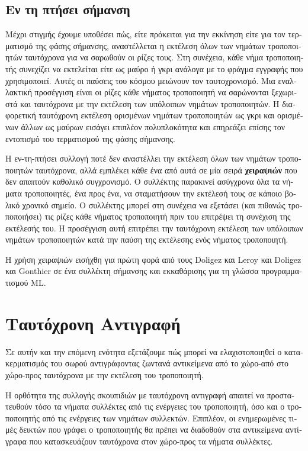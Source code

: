 \begin{greek}
\subsection{Εν τη πτήσει σήμανση}
Μέχρι στιγμής έχουμε υποθέσει πώς, είτε πρόκειται για την
εκκίνηση είτε για τον τερματισμό της φάσης σήμανσης, αναστέλλεται
η εκτέλεση όλων των νημάτων τροποποιητών ταυτόχρονα για να
σαρωθούν οι ρίζες τους. Στη συνέχεια, κάθε νήμα τροποποιητής
συνεχίζει να εκτελείται είτε ως μαύρο ή γκρι ανάλογα με το φράγμα
εγγραφής που χρησιμοποιεί. Αυτές οι παύσεις του κόσμου μειώνουν
τον ταυτοχρονισμό. Μια εναλλακτική προσέγγιση είναι οι ρίζες
κάθε νήματος τροποποιητή να σαρώνονται ξεχωριστά και ταυτόχρονα
με την εκτέλεση των υπόλοιπων νημάτων τροποποιητών. Η διαφορετική
ταυτόχρονη εκτέλεση ορισμένων νημάτων τροποποιητών ως γκρι και
ορισμένων άλλων ως μαύρων εισάγει επιπλέον πολυπλοκότητα και
επηρεάζει επίσης τον εντοπισμό του τερματισμού της φάσης σήμανσης.

Η εν-τη-πτήσει συλλογή ποτέ δεν αναστέλλει την εκτέλεση όλων
των νημάτων τροποποιητών ταυτόχρονα, αλλά εμπλέκει κάθε ένα από
αυτά σε μία σειρά \textbf{χειραψιών} που δεν απαιτούν καθολικό
συγχρονισμό. Ο συλλέκτης παρακινεί ασύγχρονα όλα τα νήματα
τροποποιητές, ένα προς ένα, να σταματήσουν την εκτέλεσή τους σε
κάποιο βολικό χρονικό σημείο. Ο συλλέκτης μπορεί στη συνέχεια
να εξετάσει (και πιθανώς τροποποιήσει) τις ρίζες κάθε νήματος
τροποποιητή πριν του επιτρέψει τη συνέχιση της εκτέλεσής του.
Η προσέγγιση αυτή επιτρέπει την ταυτόχρονη εκτέλεση των υπόλοιπων
νημάτων τροποποιητών κατά την παύση της εκτέλεσης ενός νήματος
τροποποιητή.

Η χρήση χειραψιών εισήχθη για πρώτη φορά από τους Doligez και
Leroy \cite{DBLP:conf/popl/DoligezL93} και Doligez και Gonthier
\cite{DBLP:conf/popl/DoligezG94} σε ένα συλλέκτη σήμανσης
και εκκαθάρισης για τη γλώσσα προγραμματισμού ML.

\section{Ταυτόχρονη Αντιγραφή}
Σε αυτήν και την επόμενη ενότητα εξετάζουμε πώς μπορεί να
ελαχιστοποιηθεί ο κατακερματισμός του σωρού αντιγράφοντας
ζωντανά αντικείμενα από το χώρο-από στο χώρο-προς ταυτόχρονα
με την εκτέλεση του τροποποιητή.

Η ορθότητα της συλλογής σκουπιδιών με ταυτόχρονη αντιγραφή
απαιτεί να προστατευθούν τόσο τα νήματα συλλέκτες από τις
ενέργειες του τροποποιητή, όσο και ο τροποποιητής από τις
ενέργειες των νημάτων συλλεκτών. Επιπλέον, οι ενημερωμένες
τιμές δεικτών που γράφει ο τροποποιητής θα πρέπει να
διαδοθούν στα αντικείμενα αντίγραφα που κατασκευάζουν
ταυτόχρονα στον χώρο-προς τα νήματα συλλέκτες.


\end{greek}
